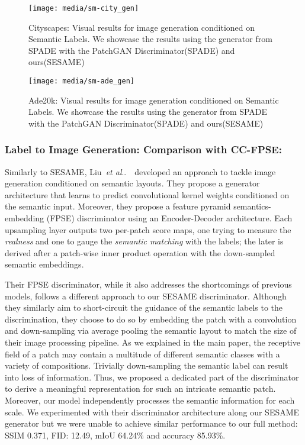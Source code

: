 \documentclass[runningheads]{llncs}
\makeatletter
\DeclareRobustCommand\onedot{\futurelet\@let@token\@onedot}
\def\@onedot{\ifx\@let@token.\else.\null\fi\xspace}
\def\etal{\emph{et al}\onedot}
\def\liu{Liu~\etal~\cite{liu2019learning}\ }
\makeatother
\begin{document}
\begin{figure}[]
\begin{center}
    \centering
    \texttt{[image: media/sm-city\_gen]}
    \caption{Cityscapes\cite{Cordts_2016_CVPR}: Visual results for image generation conditioned on Semantic Labels. We showcase the results using the generator from SPADE\cite{park2019SPADE} with the PatchGAN Discriminator(SPADE) and ours(SESAME)}
    \label{fig:city_gen}
\end{center}
\end{figure}

\begin{figure}[]
\begin{center}
    \centering
    \texttt{[image: media/sm-ade\_gen]}
    \caption{Ade20k\cite{zhou2017scene,zhou2016semantic}: Visual results for image generation conditioned on Semantic Labels. We showcase the results using the generator from SPADE\cite{park2019SPADE} with the PatchGAN Discriminator(SPADE) and ours(SESAME)}
    \label{fig:ade_gen}
\end{center}
\end{figure}

\subsubsection{Label to Image Generation: Comparison with CC-FPSE:}

Similarly to SESAME, \liu developed an approach to tackle image generation conditioned on semantic layouts.
They propose a generator architecture that learns to predict convolutional kernel weights conditioned on the semantic input.
Moreover, they propose a feature pyramid semantics-embedding (FPSE) discriminator using an Encoder-Decoder architecture. Each upsampling layer outputs two per-patch score maps, one trying to measure the \textit{realness} and one to gauge the \textit{semantic matching} with the labels; the later is derived after a patch-wise inner product operation with the down-sampled semantic embeddings. 

Their FPSE discriminator, while it also addresses the shortcomings of previous models, follows a different approach to our SESAME discriminator.
Although they similarly aim to short-circuit the guidance of the semantic labels to the discrimination, they choose to do so by embedding the patch with a  convolution and down-sampling via average pooling the semantic layout to match the size of their image processing pipeline.
As we explained in the main paper, the receptive field of a patch may contain a multitude of different semantic classes with a variety of compositions.
Trivially down-sampling the semantic label can result into loss of information.
Thus, we proposed a dedicated part of the discriminator to derive a meaningful representation for such an intricate semantic patch.
Moreover, our model independently processes the semantic information for each scale. 
 We experimented with their discriminator architecture along our SESAME generator but we were unable to achieve similar performance to our full method: SSIM 0.371, FID: 12.49, mIoU 64.24\% and accuracy 85.93\%.
\end{document}
